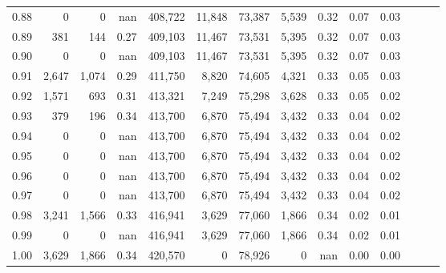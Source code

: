 \begin{tabular}{rrrrrrrrrrrrrr}
0.88 &       0 &      0 &   nan &  408,722 &   11,848 &  73,387 &   5,539 &  0.32 &  0.07 &      0.03 \\
0.89 &     381 &    144 &  0.27 &  409,103 &   11,467 &  73,531 &   5,395 &  0.32 &  0.07 &      0.03 \\
0.90 &       0 &      0 &   nan &  409,103 &   11,467 &  73,531 &   5,395 &  0.32 &  0.07 &      0.03 \\
0.91 &   2,647 &  1,074 &  0.29 &  411,750 &    8,820 &  74,605 &   4,321 &  0.33 &  0.05 &      0.03 \\
0.92 &   1,571 &    693 &  0.31 &  413,321 &    7,249 &  75,298 &   3,628 &  0.33 &  0.05 &      0.02 \\
0.93 &     379 &    196 &  0.34 &  413,700 &    6,870 &  75,494 &   3,432 &  0.33 &  0.04 &      0.02 \\
0.94 &       0 &      0 &   nan &  413,700 &    6,870 &  75,494 &   3,432 &  0.33 &  0.04 &      0.02 \\
0.95 &       0 &      0 &   nan &  413,700 &    6,870 &  75,494 &   3,432 &  0.33 &  0.04 &      0.02 \\
0.96 &       0 &      0 &   nan &  413,700 &    6,870 &  75,494 &   3,432 &  0.33 &  0.04 &      0.02 \\
0.97 &       0 &      0 &   nan &  413,700 &    6,870 &  75,494 &   3,432 &  0.33 &  0.04 &      0.02 \\
0.98 &   3,241 &  1,566 &  0.33 &  416,941 &    3,629 &  77,060 &   1,866 &  0.34 &  0.02 &      0.01 \\
0.99 &       0 &      0 &   nan &  416,941 &    3,629 &  77,060 &   1,866 &  0.34 &  0.02 &      0.01 \\
1.00 &   3,629 &  1,866 &  0.34 &  420,570 &        0 &  78,926 &       0 &   nan &  0.00 &      0.00 \\
\bottomrule
\end{tabular}
